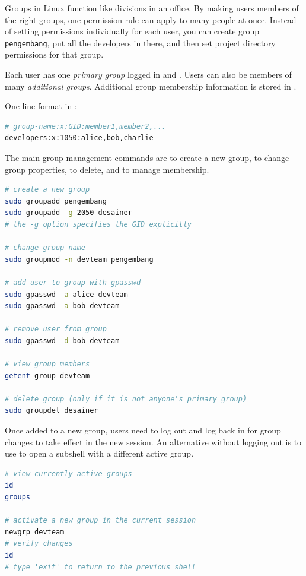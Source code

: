 Groups in Linux function like divisions in an office. By making users members of the right groups, one permission rule can apply to many people at once. Instead of setting permissions individually for each user, you can create group \texttt{pengembang}, put all the developers in there, and then set project directory permissions for that group.

Each user has one \textit{primary group} logged in  and . Users can also be members of many \textit{additional groups}. Additional group membership information is stored in .

One line format in :

\begin{lstlisting}[language=bash, caption={File format /etc/group}]
# group-name:x:GID:member1,member2,...
developers:x:1050:alice,bob,charlie
\end{lstlisting}

The main group management commands are  to create a new group,  to change group properties,  to delete, and  to manage membership.

\begin{lstlisting}[language=bash, caption={Basic operations of group management}]
# create a new group
sudo groupadd pengembang
sudo groupadd -g 2050 desainer
# the -g option specifies the GID explicitly

# change group name
sudo groupmod -n devteam pengembang

# add user to group with gpasswd
sudo gpasswd -a alice devteam
sudo gpasswd -a bob devteam

# remove user from group
sudo gpasswd -d bob devteam

# view group members
getent group devteam

# delete group (only if it is not anyone's primary group)
sudo groupdel desainer
\end{lstlisting}

Once added to a new group, users need to log out and log back in for group changes to take effect in the new session. An alternative without logging out is to use  to open a subshell with a different active group.

\begin{lstlisting}[language=bash, caption={Activate a new group without logging out}]
# view currently active groups
id
groups

# activate a new group in the current session
newgrp devteam
# verify changes
id
# type 'exit' to return to the previous shell
\end{lstlisting}

